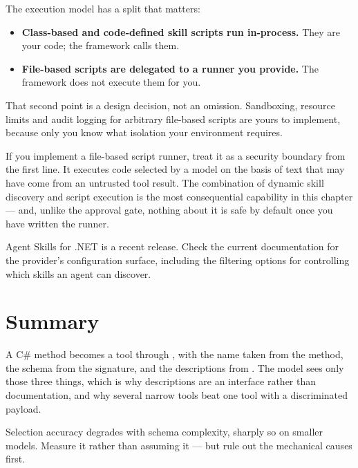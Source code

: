 The execution model has a split that matters:

\begin{itemize}[leftmargin=1.4em]
\item \textbf{Class-based and code-defined skill scripts run in-process.} They are
      your code; the framework calls them.
\item \textbf{File-based scripts are delegated to a runner you provide.} The
      framework does not execute them for you.
\end{itemize}

That second point is a design decision, not an omission. Sandboxing, resource
limits and audit logging for arbitrary file-based scripts are yours to implement,
because only you know what isolation your environment requires.

\begin{warning}
If you implement a file-based script runner, treat it as a security boundary from
the first line. It executes code selected by a model on the basis of text that may
have come from an untrusted tool result. The combination of dynamic skill
discovery and script execution is the most consequential capability in this
chapter --- and, unlike the approval gate, nothing about it is safe by default
once you have written the runner.
\end{warning}

\begin{versionbox}
Agent Skills for .NET is a recent release. Check the current documentation for
the provider's configuration surface, including the filtering options for
controlling which skills an agent can discover.
\end{versionbox}

\section{Summary}

A C\# method becomes a tool through , with the name
taken from the method, the schema from the signature, and the descriptions from
\api{[Description]}. The model sees only those three things, which is why
descriptions are an interface rather than documentation, and why several narrow
tools beat one tool with a discriminated payload.

Selection accuracy degrades with schema complexity, sharply so on smaller models.
Measure it rather than assuming it --- but rule out the mechanical causes first.

